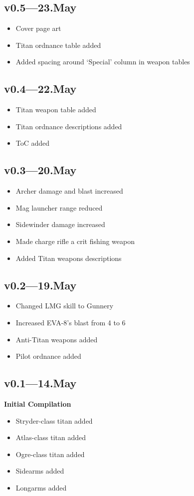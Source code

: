 \documentclass[9pt, openany]{extbook}
\begin{document}
{\subsection{v0.5---23.May}
\begin{itemize}[noitemsep]
\item Cover page art
\item Titan ordnance table added
\item Added spacing around `Special' column in weapon tables
\end{itemize}

\subsection{v0.4---22.May}
\begin{itemize}[noitemsep]
\item Titan weapon table added
\item Titan ordnance descriptions added
\item ToC added
\end{itemize}


\subsection{v0.3---20.May}
\begin{itemize}[noitemsep]
\item Archer damage and blast increased
\item Mag launcher range reduced
\item Sidewinder damage increased
\item Made charge rifle a crit fishing weapon
\item Added Titan weapons descriptions
\end{itemize}


\subsection{v0.2---19.May}
\begin{itemize}[noitemsep]
\item Changed LMG skill to Gunnery
\item Increased EVA-8's blast from 4 to 6
\item Anti-Titan weapons added
\item Pilot ordnance added
\end{itemize}


\subsection{v0.1---14.May}
\textbf{Initial Compilation}

\begin{itemize}[noitemsep]
\item Stryder-class titan added
\item Atlas-class titan added
\item Ogre-class titan added
\item Sidearms added
\item Longarms added
\end{itemize}


}
\end{document}
